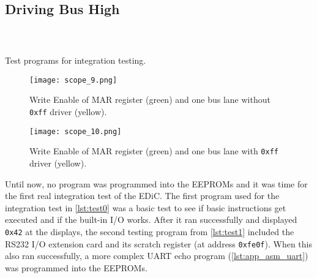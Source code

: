 \subsection{Driving Bus High}\label{sec:eval_bus}
\begin{listing}[t]
  \centering
  \begin{sublisting}[b]{.45\textwidth}
    \inputminted[linenos,
      breaklines,
      frame=leftline,
      xleftmargin=20pt,
    ]{ARM}{src/test0.s}
    \label{lst:test0}
  \end{sublisting}

  \begin{sublisting}[b]{.45\textwidth}
    \inputminted[linenos,
      breaklines,
      frame=leftline,
      xleftmargin=20pt,
    ]{ARM}{src/test1.s}
    \label{lst:test1}
  \end{sublisting}%
  \hspace{.05\textwidth}
  \begin{sublisting}[b]{.45\textwidth}
    \inputminted[linenos,
      breaklines,
      frame=leftline,
      xleftmargin=20pt,
    ]{ARM}{src/test2.s}
    \label{lst:test2}
  \end{sublisting}
  \caption{Test programs for integration testing.}
\end{listing}
\begin{figure}[t]
  \texttt{[image: scope\_9.png]}
  \caption{Write Enable of \gls{MAR} register (green) and one bus lane without \texttt{0xff} driver (yellow).}
  \label{fig:busPullup}
\end{figure}
\begin{figure}[t]
  \texttt{[image: scope\_10.png]}
  \caption{Write Enable of \gls{MAR} register (green) and one bus lane with \texttt{0xff} driver (yellow).}
  \label{fig:busPullupFix}
\end{figure}
Until now, no program was programmed into the \glspl{EEPROM} and it was time for the first real integration test of the \gls{EDiC}.
The first program used for the integration test in \cref{lst:test0} was a basic test to see if basic instructions get executed and if the built-in I/O works.
After it ran successfully and displayed \texttt{0x42} at the displays, the second testing program from \cref{lst:test1} included the RS232 I/O extension card and its scratch register (at address \texttt{0xfe0f}).
When this also ran successfully, a more complex \gls{UART} echo program (\cref{lst:app_asm_uart}) was programmed into the \glspl{EEPROM}.
